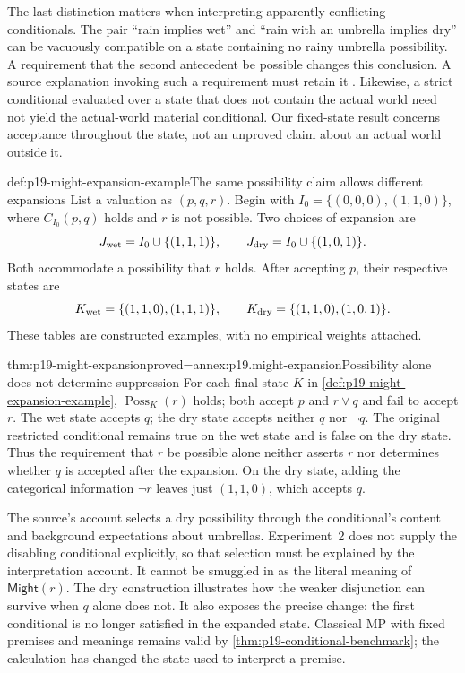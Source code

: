 The last distinction matters when interpreting apparently conflicting
conditionals. The pair ``rain implies wet'' and ``rain with an umbrella
implies dry'' can be vacuously compatible on a state containing no rainy
umbrella possibility. A requirement that the second antecedent be possible
changes this conclusion. A source explanation invoking such a requirement
must retain it \cite[Sec.~4.1, notes~3--4]{CarianiRips2017Suppression}.
Likewise, a strict conditional evaluated over a state that
does not contain the actual world need not yield the actual-world material
conditional. Our fixed-state result concerns acceptance throughout the state,
not an unproved claim about an actual world outside it.

\begin{hbexample}{def:p19-might-expansion-example}{The same possibility claim allows different expansions}
List a valuation as \((p,q,r)\). Begin with
\(I_0=\{(0,0,0),(1,1,0)\}\), where \(C_{I_0}(p,q)\) holds and
\(r\) is not possible. Two choices of expansion are
\[
 J_{\rm wet}=I_0\cup\{(1,1,1)\},\qquad
 J_{\rm dry}=I_0\cup\{(1,0,1)\}.
\]
Both accommodate a possibility that \(r\) holds. After accepting \(p\),
their respective states are
\[
 K_{\rm wet}=\{(1,1,0),(1,1,1)\},\qquad
 K_{\rm dry}=\{(1,1,0),(1,0,1)\}.
\]
These tables are constructed examples, with no empirical weights attached.
\end{hbexample}

\begin{hblemma}{thm:p19-might-expansion}{proved=annex:p19.might-expansion}{Possibility alone does not determine suppression}
For each final state \(K\) in \cref{def:p19-might-expansion-example},
\(\operatorname{Poss}_K(r)\) holds; both accept \(p\) and \(r\lor q\) and fail to
accept \(r\). The wet state accepts \(q\); the dry state accepts neither
\(q\) nor \(\neg q\). The original restricted conditional remains true
on the wet state and is false on the dry state. Thus the requirement that
\(r\) be possible alone neither asserts \(r\) nor determines whether
\(q\) is accepted after the expansion. On the dry state, adding the
categorical information \(\neg r\) leaves just \((1,1,0)\), which accepts
\(q\).
\end{hblemma}

The source's account selects a dry possibility through the conditional's
content and background expectations about umbrellas. Experiment~2 does not
supply the disabling conditional explicitly, so that selection must be
explained by the interpretation account. It cannot be smuggled in as the
literal meaning of \(\mathsf{Might}(r)\). The dry construction illustrates
how the weaker disjunction can survive when \(q\) alone does not. It also
exposes the precise change: the first conditional is no longer satisfied in
the expanded state. Classical MP with fixed premises and meanings remains
valid by \cref{thm:p19-conditional-benchmark}; the calculation has changed the
state used to interpret a premise.


